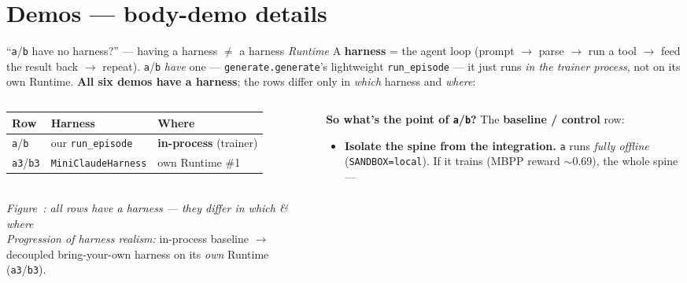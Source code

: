 \documentclass[aspectratio=169]{beamer}
\newcounter{deckfig}
\newcommand{\figtag}[1]{\refstepcounter{deckfig}%
  {\scriptsize\itshape Figure~\thedeckfig: #1}}
\begin{document}
\section{Demos --- body-demo details}

\begin{frame}{``\texttt{a}/\texttt{b} have no harness?'' --- having a harness $\neq$ a harness \emph{Runtime}}
  \footnotesize A \textbf{harness} = the agent loop (prompt $\to$ parse $\to$ run a tool $\to$ feed the
  result back $\to$ repeat). \texttt{a}/\texttt{b} \emph{have} one --- \texttt{generate.generate}'s
  lightweight \texttt{run\_episode} --- it just runs \emph{in the trainer process}, not on its own
  Runtime. \textbf{All six demos have a harness}; the rows differ only in \emph{which} harness and \emph{where}:
  \vspace{0.2em}
  \begin{columns}[T]
    \begin{column}{0.5\textwidth}
      \centering
      \renewcommand{\arraystretch}{1.25}\scriptsize
      \begin{tabular}{lll}
        \toprule
        \textbf{Row} & \textbf{Harness} & \textbf{Where} \\
        \midrule
        \texttt{a}/\texttt{b}   & our \texttt{run\_episode}     & \textbf{in-process} (trainer) \\
        \texttt{a3}/\texttt{b3} & \texttt{MiniClaudeHarness}     & own Runtime \#1 \\
        \bottomrule
      \end{tabular}
      \\[0.3em]\figtag{all rows have a harness --- they differ in which \& where}
      \\[0.4em]
      {\scriptsize \emph{Progression of harness realism:} in-process baseline $\to$ decoupled
      bring-your-own harness on its \emph{own} Runtime (\texttt{a3}/\texttt{b3}).}
    \end{column}
    \begin{column}{0.5\textwidth}
      \textbf{So what's the point of \texttt{a}/\texttt{b}?} The \textbf{baseline / control} row:
      \begin{itemize}\setlength\itemsep{0.15em}
        \item \textbf{Isolate the spine from the integration.} \texttt{a} runs \emph{fully offline}
          (\texttt{SANDBOX=local}). If it trains (MBPP reward $\sim$0.69), the whole spine ---

\end{itemize}
\end{column}
\end{columns}
\end{frame}
\end{document}
